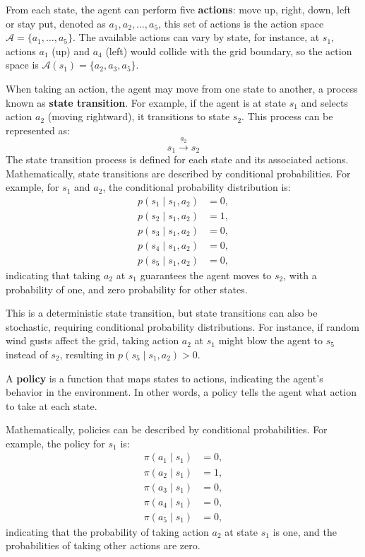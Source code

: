 From each state, the agent can perform five \textbf{actions}: move up,
right, down, left or stay put, denoted as \( a_1, a_2, \ldots, a_5 \),
this set of actions is the action space
\( \mathcal{A} = \{a_1, \ldots, a_5\} \).
The available actions can vary by state, for instance,
at \( s_1 \), actions \( a_1 \) (up) and \( a_4 \) (left) would collide
with the grid boundary, so the action space is
\( \mathcal{A}(s_1) = \{a_2, a_3, a_5\} \).

When taking an action, the agent may move from one state to another,
a process known as \textbf{state transition}. For example,
if the agent is at state \( s_1 \) and selects action
\( a_2 \) (moving rightward), it transitions to state
\( s_2 \). This process can be represented as:
\[ s_1 \overset{a_2}{\longrightarrow} s_2 \]
The state transition process is defined for each
state and its associated actions. Mathematically, state transitions
are described by conditional probabilities.
For example, for \( s_1 \) and \( a_2 \),
the conditional probability distribution is:
\[
\begin{aligned}
p(s_1 \mid s_1, a_2) &= 0, \\
p(s_2 \mid s_1, a_2) &= 1, \\
p(s_3 \mid s_1, a_2) &= 0, \\
p(s_4 \mid s_1, a_2) &= 0, \\
p(s_5 \mid s_1, a_2) &= 0,
\end{aligned}
\]
indicating that taking \( a_2 \) at \( s_1 \) guarantees
the agent moves to \( s_2 \), with a probability of one,
and zero probability for other states.

This is a deterministic state transition,
but state transitions can also be stochastic,
requiring conditional probability distributions.
For instance, if random wind gusts affect the grid,
taking action \( a_2 \) at \( s_1 \) might blow the agent to \( s_5 \)
instead of \( s_2 \), resulting in \( p(s_5 \mid s_1, a_2) > 0 \).

A \textbf{policy} is a function that maps states to actions,
indicating the agent's behavior in the environment.
In other words, a policy tells the agent what action to take
at each state.

Mathematically, policies can be described by conditional probabilities.
For example, the policy for \( s_1 \) is:
\[
\begin{aligned}
\pi(a_1 \mid s_1) &= 0, \\
\pi(a_2 \mid s_1) &= 1, \\
\pi(a_3 \mid s_1) &= 0, \\
\pi(a_4 \mid s_1) &= 0, \\
\pi(a_5 \mid s_1) &= 0,
\end{aligned}
\]
indicating that the probability of taking action \( a_2 \) at state \( s_1 \)
is one, and the probabilities of taking other actions are zero.

